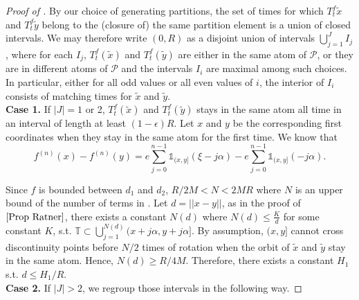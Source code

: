 \documentclass[oneside]{amsart}
\theoremstyle{plain}
\theoremstyle{definition}
\newcommand{\<}{\langle}
\renewcommand{\>}{\rangle}
\renewcommand{\P}{\mathcal{P}}
\newcommand{\e}{\epsilon}
\renewcommand{\|}{|\!|} %
\begin{document}
\begin{proof}[Proof of ]
 By our choice of generating partitions, the set of times for which $T_t^f\tilde{x}$ and $T_t^f\tilde{y}$ belong to the (closure of) the same partition element is a union of closed intervals. We may therefore write $(0,R)$ as a disjoint union of intervals
 $\displaystyle \bigcup_{j=1}^J I_j$, 
 where for each $I_j$, $T_t^f(\tilde{x})$ and 
 $T_t^f(\tilde{y})$ are either in the same atom of $\P$, or they are in different atoms of $\P$ and the intervals $I_i$ are maximal among such choices. In particular, either for all odd values or all even values of $i$, the interior of $I_i$ consists of matching times for $\tilde x$ and $\tilde y$.\\
{\bf  Case 1.} If $|J|=1$ or 2, $T_t^f(\tilde{x})$ and $T_t^f(\tilde{y})$ stays in the same atom all time in an interval of length at least
$(1-\e)R$.
Let $x$ and $y$ be the corresponding first coordinates when they stay in the same atom for the first time. We know that 
\begin{equation}
\label{Birkhoff estimate}
   f^{(n)}(x)-f^{(n)}(y)=e\sum_{j=0}^{n-1}\mathds{1}_{(x,y]}(\xi-j\alpha)-e\sum_{j=0}^{n-1}\mathds{1}_{(x,y]}(-j\alpha). 
\end{equation}

Since $f$ is bounded between \(d_1\) and \(d_2\), $R/2M<N<2MR$ where $N$ is an upper bound of the number of terms in .   Let $d=\|x-y\|$, as in the proof of \(\Cref{Prop Ratner}\), there exists a constant $N(d)$ where $N(d)\leq \frac{K}{d}$ for some constant $K$, s.t. $\mathbb{T}\subset\displaystyle\bigcup_{j=1}^{N(d)}(x+j\alpha,y+j\alpha]$.
By assumption, $(x,y]$ cannot cross discontinuity points before \(N/2\) times of rotation when the orbit of $\tilde{x}$ and $\tilde{y}$ stay in the same atom. Hence, $N(d)\geq R/4M$.
Therefore, there exists a constant $H_1$ s.t. $d\leq H_1/R$.\\
{\bf  Case 2.} If $|J|>2$, we regroup those intervals in the following way. 


\end{proof}
\end{document}
